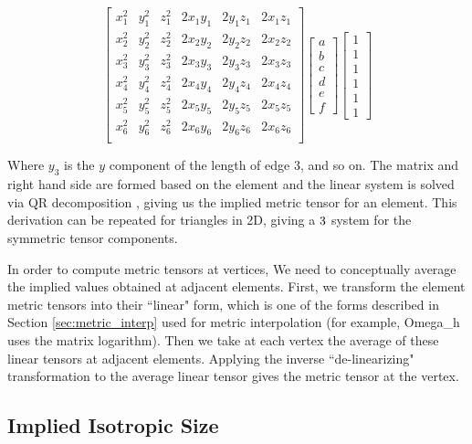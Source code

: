 \begin{equation}
\begin{bmatrix}
x_1^2 & y_1^2 & z_1^2 & 2x_1y_1 & 2y_1z_1 & 2x_1z_1 \\
x_2^2 & y_2^2 & z_2^2 & 2x_2y_2 & 2y_2z_2 & 2x_2z_2 \\
x_3^2 & y_3^2 & z_3^2 & 2x_3y_3 & 2y_3z_3 & 2x_3z_3 \\
x_4^2 & y_4^2 & z_4^2 & 2x_4y_4 & 2y_4z_4 & 2x_4z_4 \\
x_5^2 & y_5^2 & z_5^2 & 2x_5y_5 & 2y_5z_5 & 2x_5z_5 \\
x_6^2 & y_6^2 & z_6^2 & 2x_6y_6 & 2y_6z_6 & 2x_6z_6 \\
\end{bmatrix}
\begin{bmatrix}
a \\ b \\ c \\ d \\ e \\ f
\end{bmatrix}
\begin{bmatrix}
1 \\ 1 \\ 1 \\ 1 \\ 1 \\ 1
\end{bmatrix}
\end{equation}

Where $y_3$ is the $y$ component of the length of edge 3,
and so on.
The matrix and right hand side are formed based on the element
and the linear system is solved via QR decomposition
\cite{trefethen1997numerical}, giving us
the implied metric tensor for an element.
This derivation can be repeated for triangles in 2D, giving
a $3\time 3$ system for the symmetric tensor components.

In order to compute metric tensors at vertices,
We need to conceptually average the implied values obtained
at adjacent elements.
First, we transform the element metric tensors into their
``linear" form, which is one of the forms described
in Section \ref{sec:metric_interp} used for metric interpolation
(for example, Omega\_h uses the matrix logarithm).
Then we take at each vertex the average of these linear
tensors at adjacent elements.
Applying the inverse ``de-linearizing" transformation to the
average linear tensor gives the metric tensor at the vertex.

\subsection{Implied Isotropic Size}
\label{sec:ident_size}

